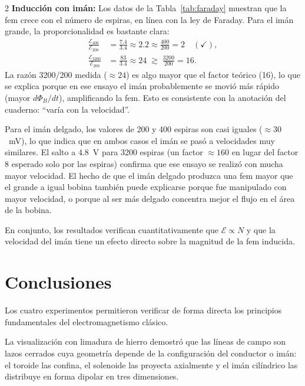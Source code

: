 \documentclass[10pt]{article}
\begin{document}
\begin{multicols}{2}
\textbf{Inducción con imán:} Los datos de la Tabla~\ref{tab:faraday} muestran que la fem crece con el número de espiras, en línea con la ley de Faraday. Para el imán grande, la proporcionalidad es bastante clara:
\begin{align*}
    \frac{\mathcal{E}_{400}}{\mathcal{E}_{200}} &= \frac{7.4}{3.4} \approx 2.2 \approx \frac{400}{200} = 2\quad(\checkmark),\\
    \frac{\mathcal{E}_{3200}}{\mathcal{E}_{200}} &= \frac{83}{3.4} \approx 24 \;\gtrsim\; \frac{3200}{200} = 16.
\end{align*}
La razón 3200/200 medida ($\approx24$) es algo mayor que el factor teórico (16), lo que se explica porque en ese ensayo el imán probablemente se movió más rápido (mayor $d\Phi_B/dt$), amplificando la fem. Esto es consistente con la anotación del cuaderno: ``varía con la velocidad''.

Para el imán delgado, los valores de 200 y 400 espiras son casi iguales ($\approx 30$~mV), lo que indica que en ambos casos el imán se pasó a velocidades muy similares. El salto a $4.8$~V para 3200 espiras (un factor $\approx160$ en lugar del factor 8 esperado solo por las espiras) confirma que ese ensayo se realizó con mucha mayor velocidad. El hecho de que el imán delgado produzca una fem mayor que el grande a igual bobina también puede explicarse porque fue manipulado con mayor velocidad, o porque al ser más delgado concentra mejor el flujo en el área de la bobina.

En conjunto, los resultados verifican cuantitativamente que $\mathcal{E} \propto N$ y que la velocidad del imán tiene un efecto directo sobre la magnitud de la fem inducida.

\section{Conclusiones}

Los cuatro experimentos permitieron verificar de forma directa los principios fundamentales del electromagnetismo clásico.

La visualización con limadura de hierro demostró que las líneas de campo son lazos cerrados cuya geometría depende de la configuración del conductor o imán: el toroide las confina, el solenoide las proyecta axialmente y el imán cilíndrico las distribuye en forma dipolar en tres dimensiones.


\end{multicols}
\end{document}
